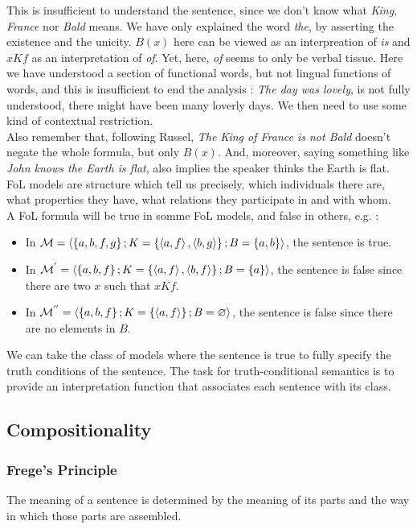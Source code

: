 \documentclass{cours}
\begin{document}
This is insufficient to understand the sentence, since we don't know what \textsl{King}, \textsl{France} nor \textsl{Bald} means. We have only explained the word \textsl{the}, by asserting the existence and the unicity. $B(x)$ here can be viewed as an interpreation of \textsl{is} and $xKf$ as an interpretation of \textsl{of}. Yet, here, \textsl{of} seems to only be verbal tissue. Here we have understood a section of functional words, but not lingual functions of words, and this is insufficient to end the analysis\! : \textsl{The day was lovely}, is not fully understood, there might have been many loverly days. We then need to use some kind of contextual restriction. \\
Also remember that, following Russel, \textsl{The King of France is not Bald} doesn't negate the whole formula, but only $B(x)$. And, moreover, saying something like \textsl{John knows the Earth is flat}, also implies the speaker thinks the Earth is flat. \\

FoL models are structure which tell us precisely, which individuals there are, what properties they have, what relations they participate in and with whom. \\
A FoL formula will be true in somme FoL models, and false in others, e.g.\! :
\begin{itemize}
    \item In $\mathcal{M} = \left\langle \left\{a, b, f, g\right\}; K = \left\{\left\langle a, f \right\rangle, \left\langle b, g \right\rangle\right\}; B = \left\{a, b\right\} \right\rangle$, the sentence is true.
    \item In $\mathcal{M}^{'} = \left\langle \left\{a, b, f\right\}; K = \left\{\left\langle a, f \right\rangle, \left\langle b, f \right\rangle\right\}; B = \left\{a\right\} \right\rangle$, the sentence is false since there are two $x$ such that $xKf$.
    \item In $\mathcal{M}^{''} = \left\langle \left\{a, b, f\right\}; K = \left\{\left\langle a, f \right\rangle\right\}; B = \varnothing \right\rangle$, the sentence is false since there are no elements in $B$.
\end{itemize}
We can take the class of models where the sentence is true to fully specify the truth conditions of the sentence. The task for truth-conditional semantics is to provide an interpretation function that associates each sentence with its class.

\subsection{Compositionality}
\subsubsection{Frege's Principle}
The meaning of a sentence is determined by the meaning of its parts and the way in which those parts are assembled.
\end{document}
